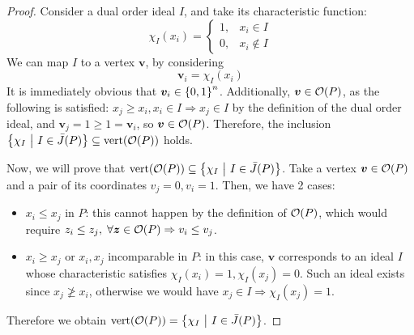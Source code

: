 \documentclass[11pt]{article}
\begin{document}
\begin{proof}
    Consider a dual order ideal $I$, and take its characteristic function:
    \[
        \chi_I(x_i) = \begin{cases}
            1, & x_i \in I \\
            0, & x_i \notin I
        \end{cases}
    \]
    We can map $I$ to a vertex $\bm{v}$, by considering
    \[
        \bm{v}_i = \chi_I(x_i)
    \]
    It is immediately obvious that $\bm{v}_i \in \left\{ 0, 1 \right\}^n$. Additionally,
    $\bm{v} \in \mathcal{O}(P)$, as the following is satisfied: $x_j \geq x_i, x_i
    \in I \Rightarrow x_j \in I$ by the definition of the dual order ideal,
    and $\bm{v}_j = 1 \geq 1 = \bm{v}_i$, so $\bm{v} \in \mathcal{O}(P)$. Therefore,
    the inclusion $\left\{ \chi_I \ \middle| \  I \in \bar{J}(P) \right\} \subseteq
    \mathrm{vert}(\mathcal{O}(P)) $ holds.

    Now, we will prove that $\mathrm{vert}(\mathcal{O}(P)) \subseteq
    \left\{ \chi_I \ \middle| \  I \in \bar{J}(P) \right\}$. Take a vertex $\bm{v} \in
    \mathcal{O}(P)$ and a pair of its coordinates $v_j = 0, v_i = 1$. Then, we
    have 2 cases:
    \begin{itemize}
    \item $x_i \leq x_j$ in $P$: this cannot happen by the definition of $
    \mathcal{O}(P)$, which would require $z_i \leq z_j, \; \forall \bm{z} \in \mathcal{O}(P)
    \Rightarrow v_i \leq v_j$.
    \item $x_i \geq x_j$ or $x_i, x_j$ incomparable in $P$: in this case,
    $\bm{v}$ corresponds to an ideal $I$ whose characteristic satisfies
    $\chi_I(x_i) = 1, \chi_I(x_j) = 0$. Such an ideal exists since $x_j \ngeq
    x_i$, otherwise we would have $x_j \in I \Rightarrow \chi_I(x_j) = 1$.
    \end{itemize}
    Therefore we obtain $\mathrm{vert}(\mathcal{O}(P)) = \left\{ \chi_I \ \middle| \ 
    I \in \bar{J}(P) \right\}$.
\end{proof}


\end{document}
